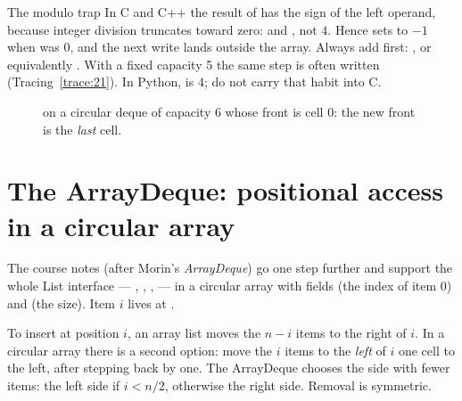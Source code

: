 
\begin{note}{The modulo trap}
In C and C++ the result of \cc{\%} has the sign of the left operand, because integer
division truncates toward zero:  and , not $4$.
Hence  sets  to $-1$ when  was $0$,
and the next write lands outside the array. Always add  first:
, or equivalently . With a fixed
capacity 5 the same step is often written 
(Tracing~\ref{trace:21}). In Python,  is $4$; do not carry that habit
into C.
\end{note}

\begin{figure}[ht]\centering
{}
\caption{ on a circular deque of capacity 6 whose front is cell 0: the
new front is the \emph{last} cell.}
\end{figure}

\section{The ArrayDeque: positional access in a circular array}

The course notes (after Morin's \emph{ArrayDeque}) go one step further and support the
whole List interface --- , , ,  --- in
a circular array with fields  (the index of item 0) and  (the size). Item $i$
lives at .

 To insert at position $i$, an array list moves the $n-i$
items to the right of $i$. In a circular array there is a second option: move the $i$
items to the \emph{left} of $i$ one cell to the left, after stepping  back by one.
The ArrayDeque chooses the side with fewer items: the left side if $i<n/2$, otherwise the
right side. Removal is symmetric.

